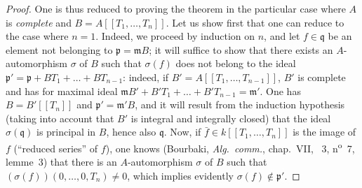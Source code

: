 \begin{proof}
One is thus reduced to proving the theorem in the particular case where $A$ is \emph{complete} and $B=A[[T_1,\ldots,T_n]]$.
Let us show first that one can reduce to the case where $n=1$.
Indeed, we proceed by induction on $n$, and let $f\in\mathfrak{q}$ be an element not belonging to $\mathfrak{p}=\mathfrak{m}B$; it will suffice to show that there exists an $A$-automorphism $\sigma$ of $B$ such that $\sigma(f)$ does not belong to the ideal $\mathfrak{p}'=\mathfrak{p}+BT_1+\ldots+BT_{n-1}$: indeed, if $B'=A[[T_1,\ldots,T_{n-1}]]$, $B'$ is complete and has for maximal ideal $\mathfrak{m}B'+B'T_1+\ldots+B'T_{n-1}=\mathfrak{m}'$.
One has $B=B'[[T_n]]$ and $\mathfrak{p}'=\mathfrak{m}'B$, and it will result from the induction hypothesis (taking into account that $B'$ is integral and integrally closed) that the ideal $\sigma(\mathfrak{q})$ is principal in $B$, hence also $\mathfrak{q}$.
Now, if $\bar{f}\in k[[T_1,\ldots,T_n]]$ is the image of $f$ (``reduced series'' of $f$), one knows (Bourbaki, \emph{Alg.\ comm.}, chap.~VII, \textsection~3, n\textsuperscript{o}~7, lemme~3) that there is an $A$-automorphism $\sigma$ of $B$ such that $(\sigma(f))(0,\ldots,0,T_n)\neq 0$, which implies evidently $\sigma(f)\notin\mathfrak{p}'$.


\end{proof}

